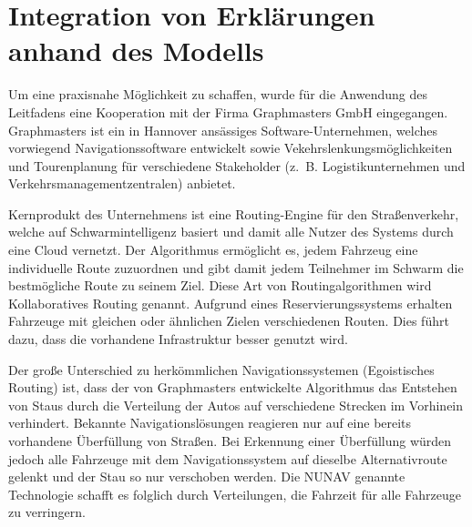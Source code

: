 \section{Integration von Erklärungen anhand des Modells}

Um eine praxisnahe Möglichkeit zu schaffen, wurde für die Anwendung des Leitfadens eine Kooperation mit der Firma Graphmasters GmbH eingegangen. Graphmasters ist ein in Hannover ansässiges Software-Unternehmen, welches vorwiegend Navigationssoftware entwickelt sowie Vekehrslenkungsmöglichkeiten und Tourenplanung für verschiedene Stakeholder (z.~B. Logistikunternehmen und Verkehrsmanagementzentralen) anbietet. 

Kernprodukt des Unternehmens ist eine Routing-Engine für den Straßenverkehr, welche auf Schwarmintelligenz basiert und damit alle Nutzer des Systems durch eine Cloud vernetzt. Der Algorithmus ermöglicht es, jedem Fahrzeug eine individuelle Route zuzuordnen und gibt damit jedem Teilnehmer im Schwarm die bestmögliche Route zu seinem Ziel. Diese Art von Routingalgorithmen wird \glqq Kollaboratives Routing\grqq{} genannt. Aufgrund eines Reservierungssystems erhalten Fahrzeuge mit gleichen oder ähnlichen Zielen verschiedenen Routen. Dies führt dazu, dass die vorhandene Infrastruktur besser genutzt wird.

Der große Unterschied zu herkömmlichen Navigationssystemen (\glqq Egoistisches Routing\grqq{}) ist, dass der von Graphmasters entwickelte Algorithmus das Entstehen von Staus durch die Verteilung der Autos auf verschiedene Strecken im Vorhinein verhindert. Bekannte Navigationslösungen reagieren nur auf eine bereits vorhandene Überfüllung von Straßen. Bei Erkennung einer Überfüllung würden jedoch alle Fahrzeuge mit dem Navigationssystem auf dieselbe Alternativroute gelenkt und der Stau so nur verschoben werden. Die NUNAV genannte Technologie schafft es folglich durch Verteilungen, die Fahrzeit für alle Fahrzeuge zu verringern.











